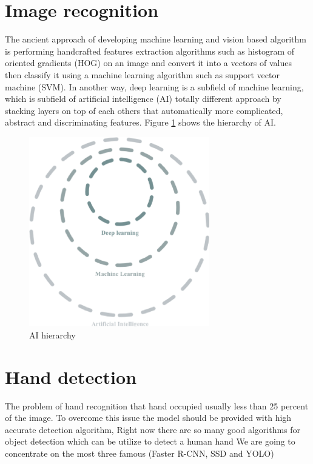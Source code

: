 \documentclass[12pt]{report}
\begin{document}
        \section{Image recognition}
         
            The ancient approach of developing machine learning and vision based algorithm
            is performing handcrafted features extraction algorithms such as histogram of oriented gradients (HOG) on an image
            and convert it into a vectors of values then classify it using a machine learning algorithm such as support vector machine (SVM).
            In another way, deep learning is a subfield of machine learning, which is subfield of artificial intelligence (AI)
            totally different approach by stacking layers on top of each others that automatically more complicated, abstract 
            and discriminating features. Figure \ref{fig:ai_hierarchy} shows the hierarchy of AI.
            \bigbreak
            \bigbreak
            \begin{figure}[h]
                \centering
                \includegraphics[width=0.7\textwidth]{./images/ai_ml_dl.png}
                \caption{AI hierarchy}
                \label{fig:ai_hierarchy}
            \end{figure} 

            \section{Hand detection}
             
                The problem of hand recognition that hand occupied usually less than 25 percent of the image.
                To overcome this issue the model should be provided with high accurate detection algorithm,
                Right now there are so many good algorithms for object detection which can be utilize to 
                detect a human hand We are going to concentrate on the most three famous (Faster R-CNN, SSD and YOLO)
\end{document}
